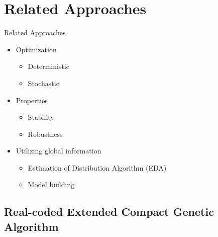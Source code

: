 \section{Related Approaches}
\begin{frame}{Related Approaches}
  \begin{itemize}
    \item Optimization
      \begin{itemize}
        \item Deterministic
        \item Stochastic
      \end{itemize}
      \vspace*{14pt}
    \item Properties
      \begin{itemize}
        \item Stability
        \item Robustness
      \end{itemize}
      \vspace*{14pt}
    \item Utilizing global information
      \begin{itemize}
        \item Estimation of Distribution Algorithm (EDA)
        \item Model building
      \end{itemize}
  \end{itemize}
\end{frame}

\subsection{Real-coded Extended Compact Genetic Algorithm}


